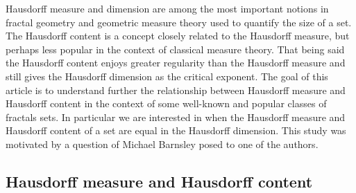 \documentclass[11pt,english,british]{article}
\numberwithin{equation}{section}
\begin{document}
Hausdorff measure and dimension are among the most important notions in fractal geometry and geometric measure theory used to quantify the size of a set.  The Hausdorff content is a concept closely related to the Hausdorff measure, but perhaps less popular in the context of classical measure theory.  That being said the Hausdorff content enjoys greater regularity than the Hausdorff measure and still gives the Hausdorff dimension as the critical exponent.  The goal of this article is to understand further the relationship between Hausdorff measure and Hausdorff content in the context of some well-known and popular classes of fractals sets.  In particular we are interested in when the Hausdorff measure and Hausdorff content of a set are equal in the Hausdorff dimension.  This study was motivated by a question of Michael Barnsley posed to one of the authors.


\subsection{Hausdorff measure and Hausdorff content}
\end{document}
